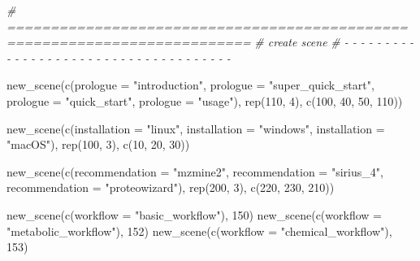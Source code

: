 \documentclass[
]{article}
\newenvironment{Shaded}{\begin{snugshade}}{\end{snugshade}}
\newcommand{\AttributeTok}[1]{\textcolor[rgb]{0.77,0.63,0.00}{#1}}
\newcommand{\CommentTok}[1]{\textcolor[rgb]{0.56,0.35,0.01}{\textit{#1}}}
\newcommand{\DecValTok}[1]{\textcolor[rgb]{0.00,0.00,0.81}{#1}}
\newcommand{\FunctionTok}[1]{\textcolor[rgb]{0.00,0.00,0.00}{#1}}
\newcommand{\NormalTok}[1]{#1}
\newcommand{\StringTok}[1]{\textcolor[rgb]{0.31,0.60,0.02}{#1}}
\begin{document}
\begin{Shaded}
\begin{Highlighting}[]
\CommentTok{\# ==========================================================================}
\CommentTok{\# create scene}
\CommentTok{\# {-} {-} {-} {-} {-} {-} {-} {-} {-} {-} {-} {-} {-} {-} {-} {-} {-} {-} {-} {-} {-} {-} {-} {-} {-} {-} {-} {-} {-} {-} {-} {-} {-} {-} {-} {-} {-}}

\FunctionTok{new\_scene}\NormalTok{(}\FunctionTok{c}\NormalTok{(}\AttributeTok{prologue =} \StringTok{"introduction"}\NormalTok{,}
    \AttributeTok{prologue =} \StringTok{"super\_quick\_start"}\NormalTok{,}
    \AttributeTok{prologue =} \StringTok{"quick\_start"}\NormalTok{,}
    \AttributeTok{prologue =} \StringTok{"usage"}\NormalTok{),}
  \FunctionTok{rep}\NormalTok{(}\DecValTok{110}\NormalTok{, }\DecValTok{4}\NormalTok{), }\FunctionTok{c}\NormalTok{(}\DecValTok{100}\NormalTok{, }\DecValTok{40}\NormalTok{, }\DecValTok{50}\NormalTok{, }\DecValTok{110}\NormalTok{))}

\FunctionTok{new\_scene}\NormalTok{(}\FunctionTok{c}\NormalTok{(}\AttributeTok{installation =} \StringTok{"linux"}\NormalTok{,}
            \AttributeTok{installation =} \StringTok{"windows"}\NormalTok{,}
            \AttributeTok{installation =} \StringTok{"macOS"}\NormalTok{),}
          \FunctionTok{rep}\NormalTok{(}\DecValTok{100}\NormalTok{, }\DecValTok{3}\NormalTok{), }\FunctionTok{c}\NormalTok{(}\DecValTok{10}\NormalTok{, }\DecValTok{20}\NormalTok{, }\DecValTok{30}\NormalTok{))}

\FunctionTok{new\_scene}\NormalTok{(}\FunctionTok{c}\NormalTok{(}\AttributeTok{recommendation =} \StringTok{"mzmine2"}\NormalTok{,}
            \AttributeTok{recommendation =} \StringTok{"sirius\_4"}\NormalTok{,}
            \AttributeTok{recommendation =} \StringTok{"proteowizard"}\NormalTok{),}
          \FunctionTok{rep}\NormalTok{(}\DecValTok{200}\NormalTok{, }\DecValTok{3}\NormalTok{), }\FunctionTok{c}\NormalTok{(}\DecValTok{220}\NormalTok{, }\DecValTok{230}\NormalTok{, }\DecValTok{210}\NormalTok{))}

\FunctionTok{new\_scene}\NormalTok{(}\FunctionTok{c}\NormalTok{(}\AttributeTok{workflow =} \StringTok{"basic\_workflow"}\NormalTok{), }\DecValTok{150}\NormalTok{)}
\FunctionTok{new\_scene}\NormalTok{(}\FunctionTok{c}\NormalTok{(}\AttributeTok{workflow =} \StringTok{"metabolic\_workflow"}\NormalTok{), }\DecValTok{152}\NormalTok{)}
\FunctionTok{new\_scene}\NormalTok{(}\FunctionTok{c}\NormalTok{(}\AttributeTok{workflow =} \StringTok{"chemical\_workflow"}\NormalTok{), }\DecValTok{153}\NormalTok{)}


\end{Highlighting}
\end{Shaded}
\end{document}
